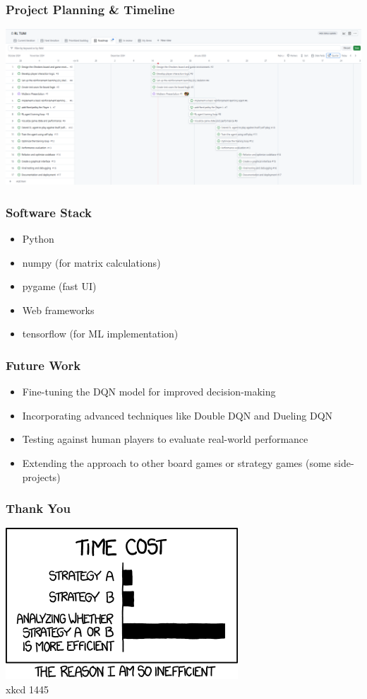 
\begin{frame}
	\frametitle{Project Planning \& Timeline}
	\vspace{0.2cm}
	\includegraphics[scale=0.45]{project-plan}
\end{frame}

\begin{frame}
	\frametitle{Software Stack}
	\vspace{1cm}
	\begin{itemize}
		\item Python
		\item numpy (for matrix calculations)
		\item pygame (fast UI)
		\item Web frameworks
		\item tensorflow (for ML implementation)
	\end{itemize}	
\end{frame}

\begin{frame}
	\frametitle{Future Work}
	\vspace{0.5cm}
	\begin{itemize}
		\item Fine-tuning the DQN model for improved decision-making
		\item Incorporating advanced techniques like Double DQN and Dueling DQN
		\item Testing against human players to evaluate real-world performance
		\item Extending the approach to other board games or strategy games (some side-projects)
	\end{itemize}
\end{frame}


\begin{frame}
	\frametitle{Thank You}
	\vspace{1cm}
	\centering
	\includegraphics{efficiency} \\
	xkcd 1445
\end{frame}






